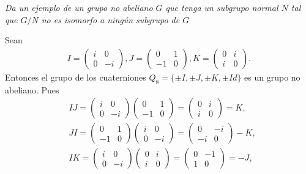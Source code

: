 \documentclass[11pt,letterpaper]{article}
\begin{document}
\begin{tcolorbox}[
	title = \textcolor{black}{\textcolor{white}{Problema 6}},]
\textit{Da un ejemplo de un grupo no abeliano $G$ que tenga un subgrupo normal $N$ tal que $G/N$ no es isomorfo a ning\'un subgrupo de $G$}
\end{tcolorbox}
\begin{Solucion}
    Sean
    \begin{align*}
        I=\begin{pmatrix} i & 0 \\ 0 & -i\end{pmatrix}, J=\begin{pmatrix} 0 & 1 \\ -1 & 0\end{pmatrix}, K=\begin{pmatrix} 0 & i \\ i & 0\end{pmatrix}.
    \end{align*}
    Entonces el grupo de los cuaterniones \(Q_8=\{\pm I, \pm J, \pm K, \pm Id\}\) es un grupo no abeliano. Pues
    \begin{align*}
        &IJ=\begin{pmatrix} i & 0 \\ 0 & -i\end{pmatrix}\begin{pmatrix} 0 & 1 \\ -1 & 0\end{pmatrix}=\begin{pmatrix} 0 & i \\ i & 0\end{pmatrix}=K, \\
        &JI=\begin{pmatrix} 0 & 1 \\ -1 & 0\end{pmatrix}\begin{pmatrix} i & 0 \\ 0 & -i\end{pmatrix}=\begin{pmatrix} 0 & -i \\ -i & 0\end{pmatrix}-K, \\
        &IK=\begin{pmatrix} i & 0 \\ 0 & -i\end{pmatrix}\begin{pmatrix} 0 & i \\ i & 0\end{pmatrix}=\begin{pmatrix} 0 & -1 \\ 1 & 0\end{pmatrix}=-J, \\

\end{align*}
\end{Solucion}
\end{document}
